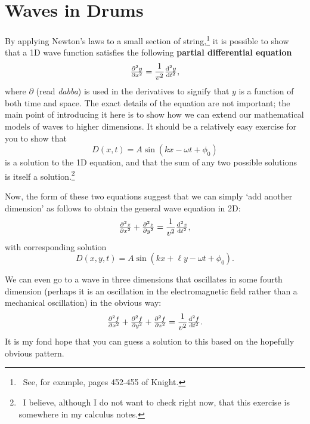 \documentclass[a4paper]{amsbook}
\theoremstyle{definition}
\numberwithin{exercise}{chapter}
\numberwithin{exercise}{chapter}
\begin{document}
\section{Waves in Drums}
By applying Newton's laws to a small section of string,\footnote{~See, for example, pages 452-455 of Knight.} it is possible to show that a
1D wave function satisfies the following \textbf{partial differential equation}
\begin{equation}
  \pd[2]{y}{x} = \frac{1}{v^2} \od[2]{y}{t},
\end{equation}
where $ \partial $ (read \textit{dabba}) is used in the derivatives to signify that $ y $ is a function of both time and space. The exact
details of the equation are not important; the main point of introducing it here is to show how we can extend our mathematical models of waves to
higher dimensions. It should be a relatively easy exercise for you to show that
\begin{equation}
  D(x, t) = A\sin(kx - \omega t + \phi_0)
\end{equation}
is a solution to the 1D equation, and that the sum of any two possible solutions is itself a solution.\footnote{~I believe, although I do not want
to check right now, that this exercise is somewhere in my calculus notes.}

Now, the form of these two equations suggest that we can simply `add another dimension' as follows to obtain the general wave equation in 2D:
\begin{equation}
  \pd[2]{z}{x} + \pd[2]{z}{y} = \frac{1}{v^2} \od[2]{z}{t},
\end{equation}
with corresponding solution
\begin{equation}
  D(x, y, t) = A\sin(kx + \ell y - \omega t + \phi_0).
\end{equation}

We can even go to a wave in three dimensions that oscillates in some fourth dimension (perhaps it is an oscillation in the electromagnetic
field rather than a mechanical oscillation) in the obvious way:
\begin{equation}
  \pd[2]{f}{x} + \pd[2]{f}{y} + \pd[2]{f}{z} = \frac{1}{v^2} \od[2]{f}{t}.
\end{equation}
It is my fond hope that you can guess a solution to this based on the hopefully obvious pattern.
\end{document}
